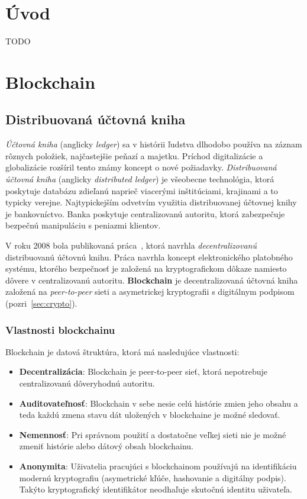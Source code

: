 \chapter{Úvod}
TODO

\chapter{Blockchain}\label{chap:blockchain}

\section{Distribuovaná účtovná kniha}
\textit{Účtovná kniha} (anglicky \textit{ledger}) sa v histórii ľudstva dlhodobo používa na záznam rôznych položiek, najčastejšie peňazí a majetku. Príchod digitalizácie a globalizácie rozšíril tento známy koncept o nové požiadavky.
\textit{Distribuovaná účtovná kniha} (anglicky \textit{distributed ledger}) je všeobecne technológia, ktorá poskytuje databázu zdieľanú naprieč viacerými inštitúciami, krajinami a to typicky verejne. Najtypickejším odvetvím využitia distribuovanej účtovnej knihy je bankovníctvo. Banka poskytuje centralizovanú autoritu, ktorá zabezpečuje bezpečnú manipuláciu s peniazmi klientov.~\cite{dltUkReport}

V roku 2008 bola publikovaná práca~\cite{satoshiBitcoin}, ktorá navrhla \textit{decentralizovanú} distribuovanú účtovnú knihu. Práca navrhla koncept elektronického platobného systému, ktorého bezpečnosť je založená na kryptografickom dôkaze namiesto dôvere v centralizovanú autoritu. \textbf{Blockchain} je decentralizovaná účtovná kniha založená na \textit{peer-to-peer} sieti a asymetrickej kryptografii s digitálnym podpisom (pozri~\ref{sec:crypto}).

\subsection{Vlastnosti blockchainu}
Blockchain je datová štruktúra, ktorá má nasledujúce vlastnosti:
\begin{itemize}
	\item \textbf{Decentralizácia}: Blockchain je peer-to-peer sieť, ktorá nepotrebuje centralizovanú dôveryhodnú autoritu.
	\item \textbf{Auditovateľnosť}: Blockchain v sebe nesie celú histórie zmien jeho obsahu a teda každú zmena stavu dát uložených v blockchaine je možné sledovať.
	\item \textbf{Nemennosť}: Pri správnom použití a dostatočne veľkej sieti nie je možné zmeniť histórie alebo dátový obsah blockchainu.
	\item \textbf{Anonymita}: Uživatelia pracujúci s blockchainom používajú na identifikáciu modernú kryptografiu (asymetrické kľúče, hashovanie a digitálny podpis). Takýto kryptografický identifikátor neodhaľuje skutočnú identitu uživateľa.
\end{itemize}

